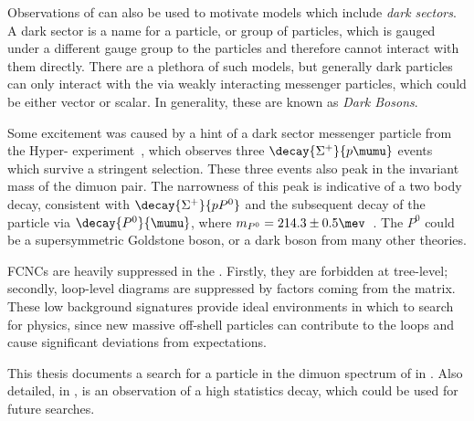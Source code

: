 Observations of \dm can also be used to motivate \bsm models which include \emph{dark sectors}.
A dark sector is a name for a particle, or group of particles, which is gauged under a
different gauge group to the \sm particles and therefore cannot interact with them directly.
There are a plethora of such models, but generally dark particles can only interact with the \sm
via weakly interacting messenger particles, which could be either vector or scalar.
In generality, these are known as \emph{Dark Bosons}.

Some excitement was caused by a hint of a dark sector messenger particle from the Hyper-\CP
experiment~\cite{Burnstein:2004uk}, which observes three $\decay{\Sigma^+}{p\mumu}$ events which
survive a stringent selection.
These three events also peak in the invariant mass of the dimuon pair.
The narrowness of this peak is indicative of a two body decay, consistent with  $\decay{\Sigma^+}{pP^0}$
and the subsequent decay of the \np particle via $\decay{P^0}{\mumu}$, where
$m_{P^0}=214.3\pm0.5\mev$~\cite{Park:2005eka}.
The $P^0$ could be a supersymmetric Goldstone boson, or a dark boson from many other theories.

\glspl{FCNC} are heavily suppressed in the \sm.
Firstly, they are forbidden at tree-level; secondly, loop-level diagrams are suppressed by factors
coming from the \ckm matrix.
These low background signatures provide ideal environments in which to search for \bsm physics,
since new massive off-shell particles can contribute to the loops and cause significant deviations
from \sm expectations.

This thesis documents a search for a \np particle in the dimuon spectrum of \btokstrmumu in
.
Also detailed, in , is an observation of a high statistics \fcnc decay,
which could be used for future \np searches.












